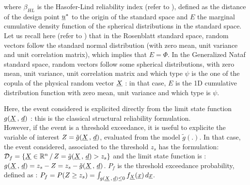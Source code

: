 {\begin{enumerate}
    where $\beta_{HL}$ is the Hasofer-Lind reliability index (refer to  ), defined as the distance of the design point ${\underline{u}}^*$ to the origin of the standard space and $E$ the marginal cumulative density function of the spherical distributions in the standard space.\\

    Let us recall here (refer to ) that in the Rosenblatt standard space, random vectors follow the standard normal distribution (with zero mean, unit variance and unit correlation matrix), which implies that $E = \Phi$. In the Generalized Nataf standard space, random vectors follow some spherical distributions, with zero mean, unit variance, unit correlation matrix and which type $\psi$ is the one of the copula of the physical random vector ${\underline{X}}$ : in that case, $E$ is the 1D cumulative distribution function with zero mean, unit variance and which type is $\psi$.
  \end{enumerate}
}
{
  Here, the event considered is explicited directly from the limit state function $g({\underline{X}}\,,\,{\underline{d}})$ : this is the classical structural reliability formulation.\\
  However, if the event is a threshold exceedance, it is useful to explicite the variable of interest $Z=\tilde{g}({\underline{X}}\,,\,{\underline{d}})$, evaluated from the model $\tilde{g}(.)$. In that case, the event considered, associated to the threshold $z_s$ has the formulation: ${\mathcal D}_f = \{ {\underline{X}} \in {\mathbb R}^n \, / \, Z=\tilde{g}({\underline{X}}\,,\,{\underline{d}}) > z_s \}$
  and the limit state function is : $g({\underline{X}}\,,\,{\underline{d}}) = z_s - Z = z_s - \tilde{g}({\underline{X}}\,,\,{\underline{d}})$. $P_f$ is the threshold exceedance probability, defined as : $P_f     =       P(Z \geq z_s) = \int_{g({\underline{X}}\,,\,{\underline{d}}) \le 0}  f_{\underline{X}}(\underline{x})\, d{\underline{x}}$.
}


